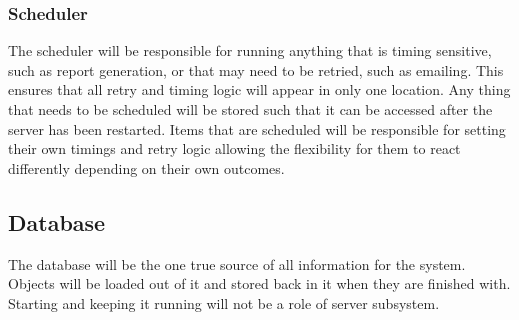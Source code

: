 \subsubsection{Scheduler}
\par
The scheduler will be responsible for running anything that is timing sensitive, such as report generation, or that may need to be retried, such as emailing. This ensures that all retry and timing logic will appear in only one location. Any thing that needs to be scheduled will be stored such that it can be accessed after the server has been restarted. Items that are scheduled will be responsible for setting their own timings and retry logic allowing the flexibility for them to react differently depending on their own outcomes.

\subsection{Database}
\par
The database will be the one true source of all information for the system. Objects will be loaded out of it and stored back in it when they are finished with. Starting and keeping it running will not be a role of server subsystem.

